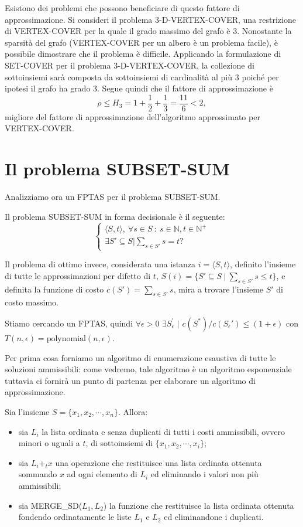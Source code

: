 Esistono dei problemi che possono beneficiare di questo fattore di approssimazione. Si consideri il problema 3-D-VERTEX-COVER, una restrizione di VERTEX-COVER per la quale il grado massimo del grafo è $3$. Nonostante la sparsità del grafo (VERTEX-COVER per un albero è un problema facile), è possibile dimostrare che il problema è difficile. Applicando la formulazione di SET-COVER per il problema 3-D-VERTEX-COVER, la collezione di sottoinsiemi sarà composta da sottoinsiemi di cardinalità al più $3$ poiché per ipotesi il grafo ha grado $3$. Segue quindi che il fattore di approssimazione è
\[
\rho \leq H_3 = 1+\frac{1}{2}+\frac{1}{3} = \frac{11}{6} < 2,
\]
migliore del fattore di approssimazione dell'algoritmo approssimato per VERTEX-COVER.

\section{Il problema SUBSET-SUM}
\label{sez:subsetsum}
Analizziamo ora un FPTAS per il problema SUBSET-SUM.

Il problema SUBSET-SUM in forma decisionale è il seguente:
\[
\begin{cases}
\langle S, t \rangle,\ \forall s\in S\ :\ s\in\mathbb{N},t\in\mathbb{N}^{+} \\
\exists S' \subseteq S | \sum_{s\in S'} s = t ?
\end{cases}
\]

Il problema di ottimo invece, considerata una istanza $i=\langle S,t \rangle$, definito l'insieme di tutte le approssimazioni per difetto di $t$, $S(i)=\{S'\subseteq S\ |\ \sum_{s\in S'}s \leq t\}$, e definita la funzione di costo $c(S')=\sum_{s\in S'} s$, mira a trovare l'insieme $S'$ di costo massimo.

Stiamo cercando un FPTAS, quindi $\forall \epsilon > 0 \,\, \exists S_{\epsilon}^{'} \,\, | \,\, c(S^*)/c(S_{\epsilon}') \leq (1+\epsilon)$ con $T(n,\epsilon)=\text{polynomial}(n,\epsilon)$.

Per prima cosa forniamo un algoritmo di enumerazione esaustiva di tutte le soluzioni ammissibili: come vedremo, tale algoritmo è un algoritmo esponenziale tuttavia ci fornirà un punto di partenza per elaborare un algoritmo di approssimazione.

Sia l'insieme $S=\{x_1, x_2, \cdots , x_n\}$. Allora:
\begin{itemize}
\item sia $L_i$ la lista ordinata e senza duplicati di tutti i costi ammissibili, ovvero minori o uguali a $t$, di sottoinsiemi di $\{x_1, x_2, \cdots , x_i\}$;
\item sia $L_i +_t x$ una operazione che restituisce una lista ordinata ottenuta sommando $x$ ad ogni elemento di $L_i$ ed eliminando i valori non più ammissibili;
\item sia MERGE\_SD($L_1,L_2$) la funzione che restituisce la lista ordinata ottenuta fondendo ordinatamente le liste $L_1$ e $L_2$ ed eliminandone i duplicati.
\end{itemize}

